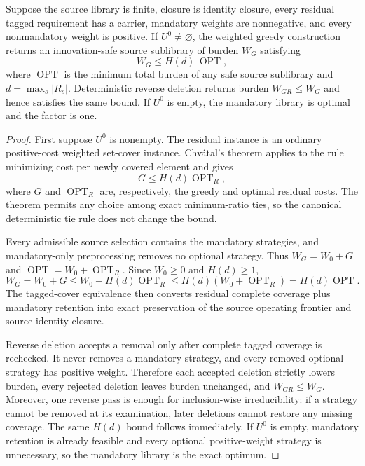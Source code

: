 \begin{theorem}
\label{thm:aor-weighted-greedy}
Suppose the source library is finite, closure is identity closure, every
residual tagged requirement has a carrier, mandatory weights are nonnegative,
and every nonmandatory weight is positive.  If $U^0\neq\varnothing$, the
weighted greedy construction returns an innovation-safe source sublibrary of
burden $W_G$ satisfying
\[
 W_G\leq H(d)\,\operatorname{OPT},
\]
where $\operatorname{OPT}$ is the minimum total burden of any safe source
sublibrary and $d=\max_s|R_s|$.  Deterministic reverse deletion returns burden
$W_{GR}\leq W_G$ and hence satisfies the same bound.  If $U^0$ is empty, the
mandatory library is optimal and the factor is one.
\end{theorem}

\begin{proof}
First suppose $U^0$ is nonempty.  The residual instance is an ordinary
positive-cost weighted set-cover instance.  Chv\'atal's theorem applies to
the rule minimizing cost per newly covered element and gives
\[
 G\leq H(d)\operatorname{OPT}_R,
\]
where $G$ and $\operatorname{OPT}_R$ are, respectively, the greedy and
optimal residual costs.  The theorem permits any choice among exact
minimum-ratio ties, so the canonical deterministic tie rule does not change
the bound.

Every admissible source selection contains the mandatory strategies, and
mandatory-only preprocessing removes no optional strategy.  Thus
$W_G=W_0+G$ and
$\operatorname{OPT}=W_0+\operatorname{OPT}_R$.  Since $W_0\geq0$ and
$H(d)\geq1$,
\[
 W_G=W_0+G
 \leq W_0+H(d)\operatorname{OPT}_R
 \leq H(d)(W_0+\operatorname{OPT}_R)
 =H(d)\operatorname{OPT}.
\]
The tagged-cover equivalence then converts residual complete coverage plus
mandatory retention into exact preservation of the source operating frontier
and source identity closure.

Reverse deletion accepts a removal only after complete tagged coverage is
rechecked.  It never removes a mandatory strategy, and every removed optional
strategy has positive weight.  Therefore each accepted deletion strictly
lowers burden, every rejected deletion leaves burden unchanged, and
$W_{GR}\leq W_G$.  Moreover, one reverse pass is enough for
inclusion-wise irreducibility: if a strategy cannot be removed at its
examination, later deletions cannot restore any missing coverage.  The same
$H(d)$ bound follows immediately.  If $U^0$ is empty, mandatory retention is
already feasible and every optional positive-weight strategy is unnecessary,
so the mandatory library is the exact optimum.
\end{proof}

